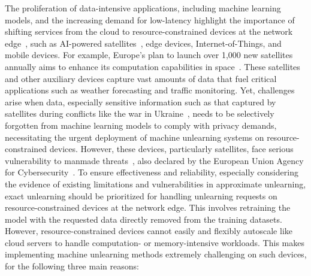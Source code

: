 \documentclass[conference,compsoc]{IEEEtran}
\begin{document}
The proliferation of data-intensive applications, including machine learning models, and the increasing demand for low-latency highlight the importance of shifting services from the cloud to resource-constrained devices at the network edge~\cite{taleb2017multi, xia2020online}, such as AI-powered satellites~\cite{erwin2024saic}, edge devices, Internet-of-Things, and mobile devices.
For example, Europe's plan to launch over 1,000 new satellites annually aims to enhance its computation capabilities in space~\cite{mattioli2023identifying}. These satellites and other auxiliary devices capture vast amounts of data that fuel critical applications such as weather forecasting and traffic monitoring. Yet, challenges arise when data, especially sensitive information such as that captured by satellites during conflicts like the war in Ukraine~\cite{borowitz2022war}, needs to be selectively forgotten from machine learning models to comply with privacy demands, necessitating the urgent deployment of machine unlearning systems on resource-constrained devices.
However, these devices, particularly satellites, face serious vulnerability to manmade threats~\cite{willbold2023space}, also declared by the European Union Agency for Cybersecurity~\cite{mattioli2023identifying}. To ensure effectiveness and reliability, especially considering the evidence of existing limitations and vulnerabilities in approximate unlearning, exact unlearning should be prioritized for handling unlearning requests on resource-constrained devices at the network edge. This involves retraining the model with the requested data directly removed from the training datasets.
However, resource-constrained devices cannot easily and flexibly autoscale like cloud servers to handle computation- or memory-intensive workloads. This makes implementing machine unlearning methods extremely challenging on such devices, for the following three main reasons:
\end{document}
